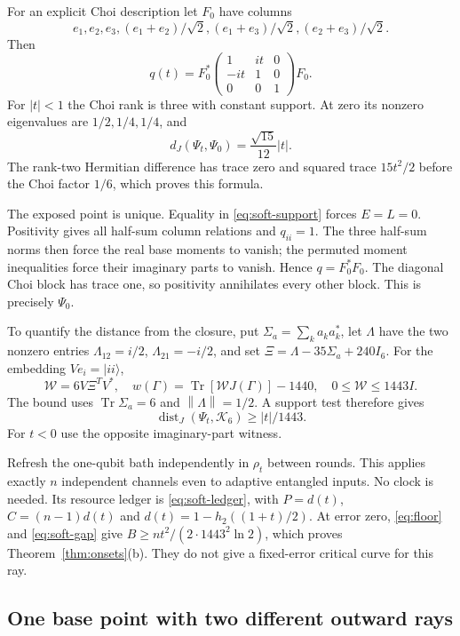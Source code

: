 \documentclass[11pt]{article}
\theoremstyle{definition}
\theoremstyle{remark}
\DeclareMathOperator{\Tr}{Tr}
\DeclareMathOperator{\dist}{dist}
\newcommand{\K}{\mathcal K}
\newcommand{\norm}[1]{\left\lVert#1\right\rVert}
\newcommand{\ket}[1]{\lvert#1\rangle}
\begin{document}
For an explicit Choi description let $F_0$ have columns
\[
 e_1,e_2,e_3,(e_1+e_2)/\sqrt2,(e_1+e_3)/\sqrt2,(e_2+e_3)/\sqrt2.
\]
Then
\[
 q(t)=F_0^*\begin{pmatrix}1&it&0\\-it&1&0\\0&0&1\end{pmatrix}F_0.
\]
For $|t|<1$ the Choi rank is three with constant support. At zero its nonzero eigenvalues are $1/2,1/4,1/4$, and
\begin{equation}\label{eq:soft-distance}
 d_J(\Psi_t,\Psi_0)=\frac{\sqrt{15}}{12}|t|.
\end{equation}
The rank-two Hermitian difference has trace zero and squared trace $15t^2/2$ before the Choi factor $1/6$, which proves this formula.

The exposed point is unique. Equality in \eqref{eq:soft-support} forces $E=L=0$. Positivity gives all half-sum column relations and $q_{ii}=1$. The three half-sum norms then force the real base moments to vanish; the permuted moment inequalities force their imaginary parts to vanish. Hence $q=F_0^*F_0$. The diagonal Choi block has trace one, so positivity annihilates every other block. This is precisely $\Psi_0$.

To quantify the distance from the closure, put $\Sigma_a=\sum_k a_ka_k^*$, let $\Lambda$ have the two nonzero entries $\Lambda_{12}=i/2$, $\Lambda_{21}=-i/2$, and set $\Xi=\Lambda-35\Sigma_a+240I_6$. For the embedding $V e_i=\ket{ii}$,
\[
 \mathcal W=6V\Xi^TV^*,\quad w(\Gamma)=\Tr[\mathcal WJ(\Gamma)]-1440,
 \quad 0\le\mathcal W\le1443I.
\]
The bound uses $\Tr\Sigma_a=6$ and $\norm\Lambda=1/2$. A support test therefore gives
\begin{equation}\label{eq:soft-gap}
 \dist_J(\Psi_t,\K_6)\ge|t|/1443.
\end{equation}
For $t<0$ use the opposite imaginary-part witness.

Refresh the one-qubit bath independently in $\rho_t$ between rounds. This applies exactly $n$ independent channels even to adaptive entangled inputs. No clock is needed. Its resource ledger is \eqref{eq:soft-ledger}, with $P=d(t)$, $C=(n-1)d(t)$ and $d(t)=1-h_2((1+t)/2)$. At error zero, \eqref{eq:floor} and \eqref{eq:soft-gap} give $B\ge nt^2/(2\cdot1443^2\ln2)$, which proves Theorem~\ref{thm:onsets}(b). They do not give a fixed-error critical curve for this ray.

\subsection{One base point with two different outward rays}
\end{document}
